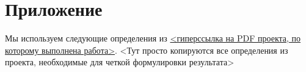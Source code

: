 \section*{Приложение}

Мы используем следующие определения из  \href{https://edu.sirius.online/}{<гиперссылка на PDF проекта, по которому выполнена работа>}. <Тут просто копируются все определения из проекта, необходимые для четкой формулировки результата>

